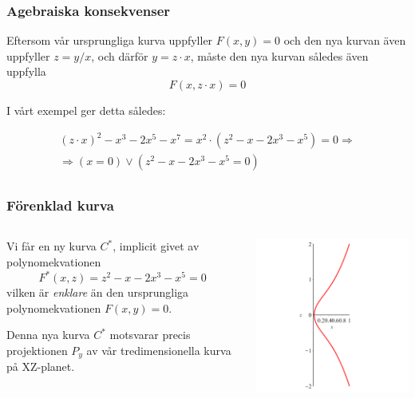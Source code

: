 \documentclass{beamer}
\begin{document}
\begin{frame}
	\frametitle{Agebraiska konsekvenser}
Eftersom vår ursprungliga kurva uppfyller $F(x,y)=0$ och den nya kurvan även uppfyller $z=y/x$, och därför $y=z\cdot x$, måste den nya kurvan således även uppfylla
\[F(x,z\cdot x)=0\]

I vårt exempel ger detta således:

\[
\begin{array}{c}
(z\cdot x)^2-x^3-2x^5-x^7 = x^2 \cdot \left(z^2-x-2x^3-x^5\right) = 0 \Longrightarrow\\[5pt]
\Longrightarrow (x=0) \vee (z^2-x-2x^3-x^5=0)\\
\end{array}
\]
\end{frame}

\begin{frame}
	\frametitle{Förenklad kurva}
	\begin{columns}[onlytextwidth]
		\begin{column}{0.5\textwidth}
			Vi får en ny kurva $C^*$, implicit givet av polynomekvationen \[F^*(x,z)=z^2-x-2x^3-x^5=0\] vilken är \emph{enklare} än den ursprungliga polynomekvationen $F(x,y)=0$.
			
			\vspace{20pt}
			Denna nya kurva $C^*$ motsvarar precis projektionen $P_y$ av vår tredimensionella kurva på XZ-planet.
		\end{column}
		\begin{column}{0.5\textwidth}
			\begin{center}
				\includegraphics[scale=0.45]{Export/blowupex1_4.png}
			\end{center}
		\end{column}
	\end{columns}	
\end{frame}
\end{document}
